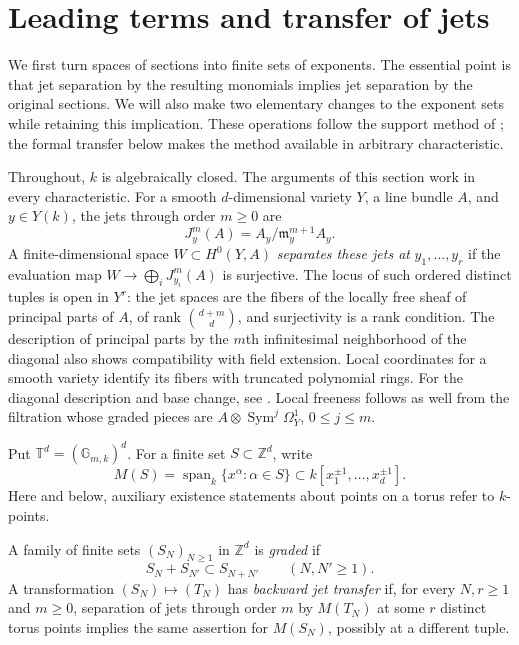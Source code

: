\section{Leading terms and transfer of jets}\label{sec:transfer}

We first turn spaces of sections into finite sets of exponents.  The essential point is that jet separation by the resulting monomials implies jet separation by the original sections.  We will also make two elementary changes to the exponent sets while retaining this implication. These operations follow the support method of \cite[Section~2]{OpenAI2026Higher}; the formal transfer below makes the method available in arbitrary characteristic.

Throughout, $k$ is algebraically closed.  The arguments of this section work in every characteristic.  For a smooth $d$-dimensional variety $Y$, a line bundle $A$, and $y\in Y(k)$, the jets through order $m\geq0$ are
\[
 J_y^m(A)=A_y/\mathfrak{m}_y^{m+1}A_y.
\]
A finite-dimensional space $W\subset H^0(Y,A)$ \emph{separates these jets at} $y_1,\ldots,y_r$ if the evaluation map $W\to\bigoplus_i J_{y_i}^m(A)$ is surjective.  The locus of such ordered distinct tuples is open in $Y^r$: the jet spaces are the fibers of the locally free sheaf of principal parts of $A$, of rank $\binom{d+m}{d}$, and surjectivity is a rank condition.  The description of principal parts by the $m$th infinitesimal neighborhood of the diagonal also shows compatibility with field extension.  Local coordinates for a smooth variety identify its fibers with truncated polynomial rings. For the diagonal description and base change, see \cite[Tags~\href{https://stacks.math.columbia.edu/tag/0H90}{0H90} and~\href{https://stacks.math.columbia.edu/tag/0H8Z}{0H8Z}]{Stacks}.  Local freeness follows as well from the filtration whose graded pieces are $A\otimes\operatorname{Sym}^j\Omega_Y^1$, $0\leq j\leq m$.

Put $\mathbb{T}^d=(\mathbb{G}_{m,k})^d$.  For a finite set $S\subset\mathbb{Z}^d$, write
\[
 M(S)=\operatorname{span}_k\{x^\alpha:\alpha\in S\}
 \subset k[x_1^{\pm1},\ldots,x_d^{\pm1}].
\]
Here and below, auxiliary existence statements about points on a torus refer to $k$-points.

\begin{definition}\label{def:graded}
A family of finite sets $(S_N)_{N\geq1}$ in $\mathbb{Z}^d$ is \emph{graded} if
\[
 S_N+S_{N'}\subset S_{N+N'}\qquad(N,N'\geq1).
\]
A transformation $(S_N)\mapsto(T_N)$ has \emph{backward jet transfer} if, for every $N,r\geq1$ and $m\geq0$, separation of jets through order $m$ by $M(T_N)$ at some $r$ distinct torus points implies the same assertion for $M(S_N)$, possibly at a different tuple.
\end{definition}


